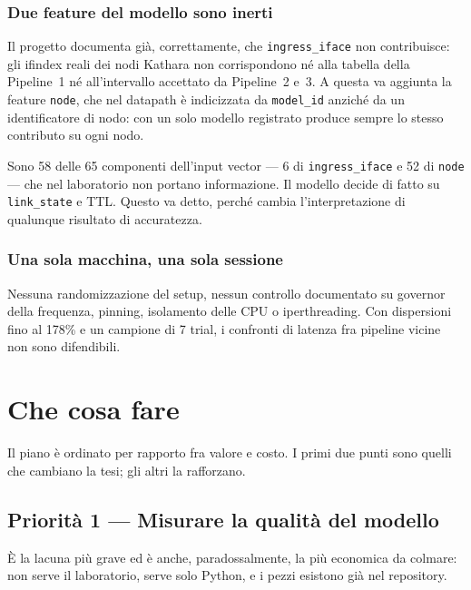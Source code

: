 \documentclass[11pt,a4paper,oneside]{report}
\begin{document}
\subsection{Due feature del modello sono inerti}

Il progetto documenta già, correttamente, che \texttt{ingress\_iface}
non contribuisce: gli ifindex reali dei nodi Kathara non corrispondono
né alla tabella della Pipeline~1 né all'intervallo accettato da
Pipeline~2 e~3. A questa va aggiunta la feature \texttt{node}, che nel
datapath è indicizzata da \texttt{model\_id} anziché da un
identificatore di nodo: con un solo modello registrato produce sempre
lo stesso contributo su ogni nodo.

Sono 58 delle 65 componenti dell'input vector --- 6 di
\texttt{ingress\_iface} e 52 di \texttt{node} --- che nel laboratorio
non portano informazione. Il modello decide di fatto su
\texttt{link\_state} e TTL. Questo va detto, perché cambia
l'interpretazione di qualunque risultato di accuratezza.

\subsection{Una sola macchina, una sola sessione}

Nessuna randomizzazione del setup, nessun controllo documentato su
governor della frequenza, pinning, isolamento delle CPU o
iperthreading. Con dispersioni fino al 178\% e un campione di 7 trial,
i confronti di latenza fra pipeline vicine non sono difendibili.

\chapter{Che cosa fare}
\label{ch:fare}

Il piano è ordinato per rapporto fra valore e costo. I primi due punti
sono quelli che cambiano la tesi; gli altri la rafforzano.

\section{Priorità 1 --- Misurare la qualità del modello}

È la lacuna più grave ed è anche, paradossalmente, la più economica da
colmare: non serve il laboratorio, serve solo Python, e i pezzi
esistono già nel repository.
\end{document}
